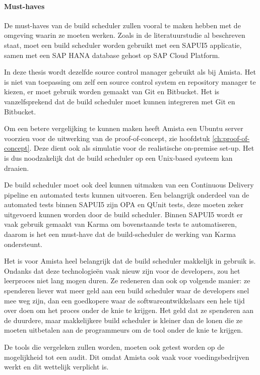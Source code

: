             \paragraph{Must-haves}
            De must-haves van de build scheduler zullen vooral te maken hebben met de omgeving waarin ze moeten werken. Zoals in de literatuurstudie al beschreven staat, moet een build scheduler worden gebruikt met een SAPUI5 applicatie, samen met een SAP HANA database gehost op SAP Cloud Platform.
            
            In deze thesis wordt dezelfde source control manager gebruikt als bij Amista. Het is niet van toepassing om zelf een source control system en repository manager te kiezen, er moet gebruik worden gemaakt van Git en Bitbucket. Het is vanzelfsprekend dat de build scheduler moet kunnen integreren met Git en Bitbucket.

            Om een betere vergelijking te kunnen maken heeft Amista een Ubuntu server voorzien voor de uitwerking van de proof-of-concept, zie hoofdstuk \ref{ch:proof-of-concept}. Deze dient ook als simulatie voor de realistische on-premise set-up. Het is dus noodzakelijk dat de build scheduler op een Unix-based systeem kan draaien.
            
            De build scheduler moet ook deel kunnen uitmaken van een Continuous Delivery pipeline en automated tests kunnen uitvoeren. Een belangrijk onderdeel van de automated tests binnen SAPUI5 zijn OPA en QUnit  tests, deze moeten zeker uitgevoerd kunnen worden door de build scheduler.
            Binnen SAPUI5 wordt er vaak gebruik gemaakt van Karma om bovenstaande tests te automatiseren, daarom is het een must-have dat de build-scheduler de werking van Karma ondersteunt.
            
            Het is voor Amista heel belangrijk dat de build scheduler makkelijk in gebruik is. Ondanks dat deze technologieën vaak nieuw zijn voor de developers, zou het leerproces niet lang mogen duren. Ze redeneren dan ook op volgende manier: ze spenderen liever wat meer geld aan een build scheduler waar de developers snel mee weg zijn, dan een goedkopere waar de softwareontwikkelaars een hele tijd over doen om het proces onder de knie te krijgen. Het geld dat ze spenderen aan de duurdere, maar makkelijkere build scheduler is kleiner dan de lonen die ze moeten uitbetalen aan de programmeurs om de tool onder de knie te krijgen.
            
            De tools die vergeleken zullen worden, moeten ook getest worden op de mogelijkheid tot een audit. Dit omdat Amista ook vaak voor voedingsbedrijven werkt en dit wettelijk verplicht is.

